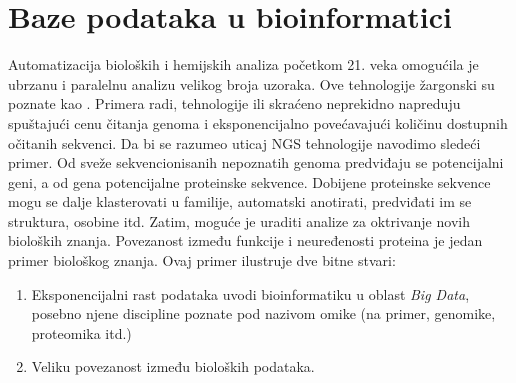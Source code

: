 \chapter{Baze podataka u bioinformatici} %

\label{Baze} %

Automatizacija bioloških i hemijskih analiza početkom 21. veka omogućila je
ubrzanu i paralelnu analizu velikog broja uzoraka. Ove tehnologije žargonski su
poznate kao  . Primera radi, tehnologije 
 ili skraćeno  neprekidno napreduju
spuštajući cenu čitanja genoma i eksponencijalno povećavajući količinu dostupnih
očitanih sekvenci. Da bi se razumeo uticaj NGS tehnologije navodimo sledeći
primer.  Od sveže sekvencionisanih nepoznatih genoma predviđaju se potencijalni
geni, a od gena potencijalne proteinske sekvence.  Dobijene proteinske sekvence
mogu se dalje klasterovati u familije, automatski anotirati, predviđati im se
struktura, osobine itd.  Zatim, moguće je uraditi analize za oktrivanje novih
bioloških znanja. Povezanost između funkcije i neuređenosti proteina je jedan
primer biološkog znanja.  Ovaj primer ilustruje dve bitne stvari:
\begin{enumerate}
  \item Eksponencijalni rast podataka uvodi bioinformatiku u oblast \textit{Big Data},
    posebno njene discipline poznate pod nazivom omike (na primer, genomike, proteomika itd.)
  \item Veliku povezanost između bioloških podataka.
\end{enumerate}

